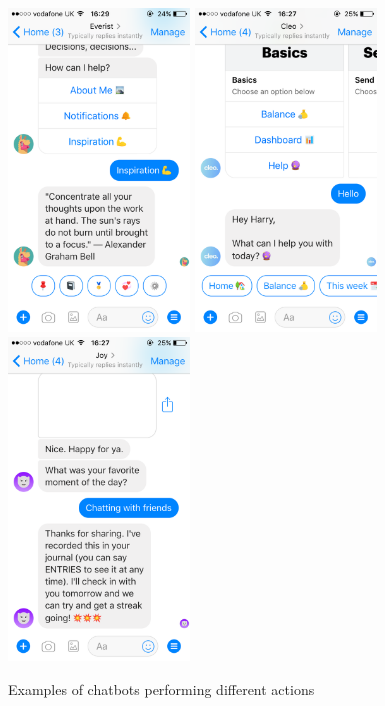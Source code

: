 \begin{figure}[H]
  \centering
  \includegraphics[width=1.9in]{../resources/existing-bots/everist.png}
  \hspace{10px}
  \includegraphics[width=1.9in]{../resources/existing-bots/cleo.png}
  \hspace{10px}
  \includegraphics[width=1.9in]{../resources/existing-bots/joy-ai.png}
  \caption{Examples of chatbots performing different actions}
  \label{fig:chatbots_examples}
\end{figure}


